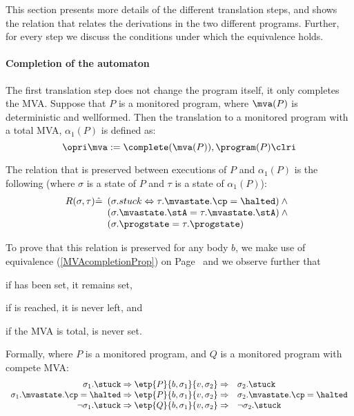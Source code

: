 This section presents more details of the different translation steps,
and shows the relation that relates the derivations in the two
different programs. Further, for every step we discuss the conditions
under which the equivalence holds.



\paragraph{Completion of the automaton}
The first translation step does not change the program itself, it only
completes the MVA. Suppose that \(P\) is a monitored program, where
\(\mva(P)\) is deterministic and wellformed. Then the translation to a
monitored program with a total MVA, \(\alpha_1(P)\) is defined as:
\[
\opri \mva := \complete(\mva(P)), \program(P) \clri
\]

The relation that is preserved between executions of \(P\) and
\(\alpha_1(P)\) is the following (where \(\sigma\) is a state of
\(P\) and \(\tau\) is a state of \(\alpha_1(P)\)):
\[R(\sigma, \tau) \hat=
 \begin{array}[t]{l}
  (\sigma.stuck \Leftrightarrow \tau.\mvastate.\cp = \halted) \:\wedge \\
  (\sigma.\mvastate.\stA = \tau.\mvastate.\stA) \:\wedge \\
  (\sigma.\progstate = \tau.\progstate)
\end{array}
\]

To prove that this relation is preserved for any body \(b\), we make
use of equivalence (\ref{MVAcompletionProp}) on
Page~\pageref{MVAcompletionProp} and we observe further that
\begin{inparaenum}
\item if \stuck has been set, it remains set,
\item if \halted is reached, it is never left, and
\item if the MVA is total, \stuck is never set.
\end{inparaenum} Formally, where \(P\) is a monitored program, and
\(Q\) is a monitored program with compete MVA:
\[
\begin{array}[t]{rl}
\sigma_1.\stuck \Rightarrow
\etp{P}{b,\sigma_1}{v,\sigma_2} \Rightarrow &
\sigma_2.\stuck \\
\sigma_1.\mvastate.\cp = \halted \Rightarrow
\etp{P}{b,\sigma_1}{v,\sigma_2} \Rightarrow &
\sigma_2.\mvastate.\cp = \halted \\
\neg \sigma_1.\stuck \Rightarrow
\etp{Q}{b,\sigma_1}{v,\sigma_2} \Rightarrow &
\neg \sigma_2.\stuck
\end{array}
\]

